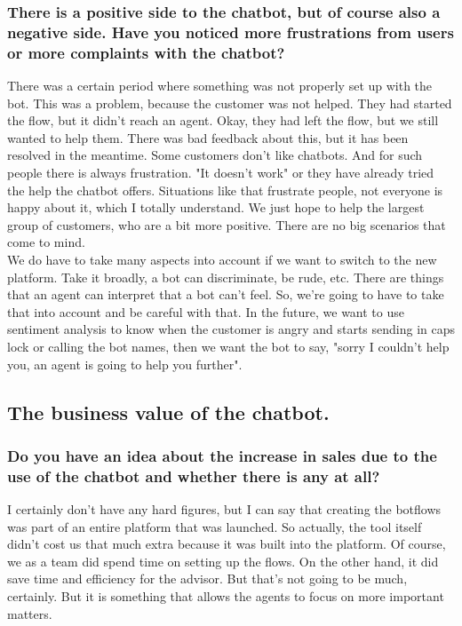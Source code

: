 \begin{appendices}
	\subsubsection{There is a positive side to the chatbot, but of course also a negative side. Have you noticed more frustrations from users or more complaints with the chatbot?}
	There was a certain period where something was not properly set up with the bot. This was a problem, because the customer was not helped. They had started the flow, but it didn't reach an agent. Okay, they had left the flow, but we still wanted to help them. There was bad feedback about this, but it has been resolved in the meantime. Some customers don't like chatbots. And for such people there is always frustration. "It doesn't work" or they have already tried the help the chatbot offers. Situations like that frustrate people, not everyone is happy about it, which I totally understand. We just hope to help the largest group of customers, who are a bit more positive. There are no big scenarios that come to mind.\\
	\break
	We do have to take many aspects into account if we want to switch to the new platform. Take it broadly, a bot can discriminate, be rude, etc. There are things that an agent can interpret that a bot can't feel. So, we're going to have to take that into account and be careful with that. In the future, we want to use sentiment analysis to know when the customer is angry and starts sending in caps lock or calling the bot names, then we want the bot to say, "sorry I couldn't help you, an agent is going to help you further".
	
	\subsection{The business value of the chatbot.}
	\subsubsection{Do you have an idea about the increase in sales due to the use of the chatbot and whether there is any at all?}
	I certainly don't have any hard figures, but I can say that creating the botflows was part of an entire platform that was launched. So actually, the tool itself didn't cost us that much extra because it was built into the platform. Of course, we as a team did spend time on setting up the flows. On the other hand, it did save time and efficiency for the advisor. But that's not going to be much, certainly. But it is something that allows the agents to focus on more important matters. 
	

\end{appendices}
